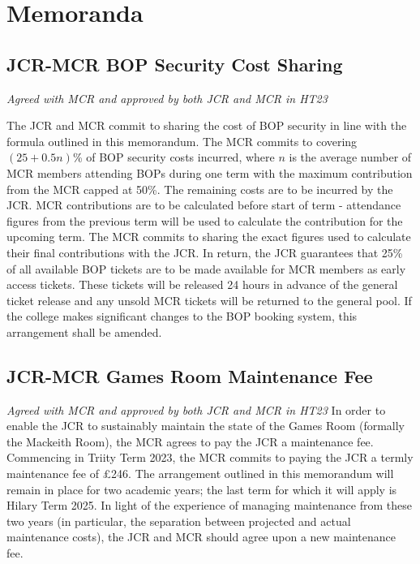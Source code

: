 \chapter{Memoranda}
\section{JCR-MCR BOP Security Cost Sharing}
\textit{Agreed with MCR and approved by both JCR and MCR in HT23}

\appnpara The JCR and MCR commit to sharing the cost of BOP security in line with the formula outlined in this memorandum. 
\appnpara The MCR commits to covering $(25+0.5n)$\% of BOP security costs incurred, where $n$ is the average number of MCR members attending BOPs during one term with the maximum contribution from the MCR capped at 50\%. The remaining costs are to be incurred by the JCR.
\appnpara MCR contributions are to be calculated before start of term - attendance figures from the previous term will be used to calculate the contribution for the upcoming term. The MCR commits to sharing the exact figures used to calculate their final contributions with the JCR.
\appnpara In return, the JCR guarantees that 25\% of all available BOP tickets are to be made available for MCR members as early access tickets. These tickets will be released 24 hours in advance of the general ticket release and any unsold MCR tickets will be returned to the general pool. 
\appnpara If the college makes significant changes to the BOP booking system, this arrangement shall be amended. 

\section {JCR-MCR Games Room Maintenance Fee}
\textit{Agreed with MCR and approved by both JCR and MCR in HT23}
\appnpara In order to enable the JCR to sustainably maintain the state of the Games Room (formally the Mackeith Room), the MCR agrees to pay the JCR a maintenance fee.
\appnpara Commencing in Triity Term 2023, the MCR commits to paying the JCR a termly maintenance fee of £246. 
\appnpara The arrangement outlined in this memorandum will remain in place for two academic years; the last term for which it will apply is Hilary Term 2025. In light of the experience of managing maintenance from these two years (in particular, the separation between projected and actual maintenance costs), the JCR and MCR should agree upon a new maintenance fee. 
